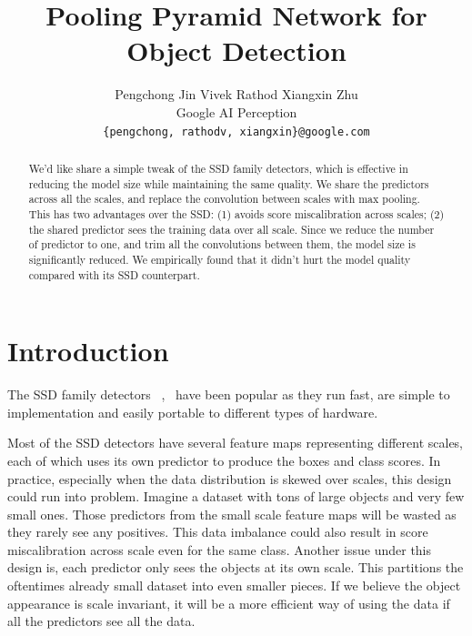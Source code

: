 \documentclass[10pt,twocolumn,letterpaper]{article}
\begin{document}
\title{Pooling Pyramid Network for Object Detection}

\author{
Pengchong Jin
\hspace*{32pt}
Vivek Rathod
\hspace*{32pt}
Xiangxin Zhu
\\
Google AI Perception\\
{\tt\small \{pengchong, rathodv, xiangxin\}@google.com}
}


\maketitle

\begin{abstract}
We'd like share a simple tweak of the SSD family detectors,
  which is effective in reducing the model size while
  maintaining the same quality. We share the predictors
  across all the scales, and replace the convolution between
  scales with max pooling. This has two advantages over the 
  SSD: (1) avoids score miscalibration across scales; (2)
  the shared predictor sees the training data over all
  scale. Since we reduce the number of predictor to one, and
  trim all the convolutions between them, the model size is
  significantly reduced. We empirically found that it didn't
  hurt the model quality compared with its SSD counterpart.

\end{abstract}

\section{Introduction}
The SSD family detectors
~\cite{liu2016ssd},~\cite{lin2017focal} have
been popular as they run fast, are simple to implementation
and easily portable to different types of hardware.


Most of the SSD detectors have several feature maps
representing different scales, each of which uses its own
predictor to produce the boxes and class scores.
In practice, especially when the data distribution is skewed
over scales, this design could run into problem. Imagine a
dataset with tons of large objects and very few small ones.
Those predictors from the small scale feature maps will be
wasted as they rarely see any positives. This data imbalance
could also result in score miscalibration across scale even
for the same class. Another issue under this design is, each
predictor only sees the objects at its own scale. This
partitions the oftentimes already small dataset
into even smaller pieces. If we believe the object
appearance is scale invariant, it will be a more efficient
way of using the data if all the predictors see all the
data.
\end{document}
